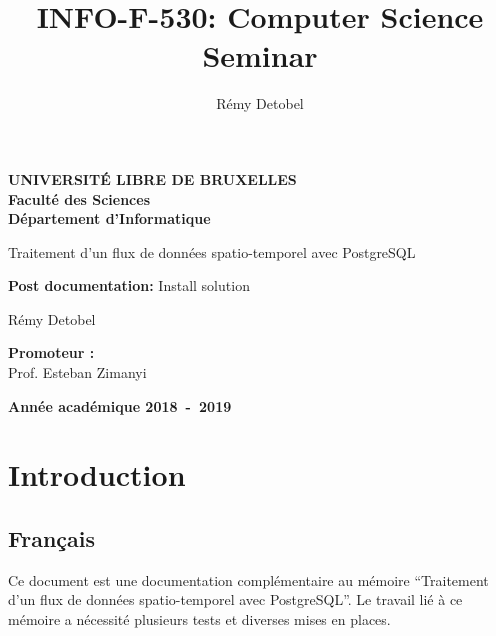 \documentclass[a4paper,12pt]{article}
\title{INFO-F-530: Computer Science Seminar}
\author{Rémy Detobel}
\begin{document}
\begin{titlepage}
\begin{center}
\textbf{UNIVERSIT\'E LIBRE DE BRUXELLES}\\
\textbf{Faculté des Sciences}\\
\textbf{Département d'Informatique}
\vfill{}\vfill{}

{\Huge  Traitement d'un flux de données \vspace*{.5cm}  \linebreak[4] spatio-temporel avec PostgreSQL}

{\Huge \par \vspace*{1cm}}
\begin{center}{\LARGE \textbf{Post documentation:} Install solution}\end{center}{\Huge \par}

{\Huge \par}
\begin{center}{\LARGE Rémy Detobel}\end{center}{\Huge \par}
\vfill{}\vfill{}
\begin{flushright}{\large \textbf{Promoteur :}}\\
{\large Prof. Esteban Zimanyi}\end{flushright}{\large\par}
\vfill{}\vfill{}\enlargethispage{3cm}
\textbf{Année académique 2018~-~2019}
\end{center}
\end{titlepage}
\newpage

\tableofcontents
\newpage

\section{Introduction}

    \subsection{Français}
        Ce document est une documentation complémentaire au mémoire ``Traitement d'un flux de données spatio-temporel avec PostgreSQL''. Le travail lié à ce mémoire a nécessité plusieurs tests et diverses mises en places.\\
        
\end{document}
